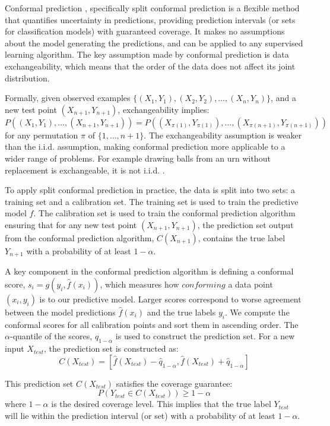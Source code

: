 Conformal prediction \cite{vovk2022algorithmic}, specifically split conformal prediction is a flexible method that quantifies uncertainty in predictions, providing prediction intervals (or sets for classification models) with guaranteed coverage. It makes no assumptions about the model generating the predictions, and can be applied to any supervised learning algorithm.
The key assumption made by conformal prediction is data exchangeability, which means that the order of the data does not affect its joint distribution.

Formally, given observed examples $\{(X_1, Y_1), (X_2, Y_2), \ldots, (X_n, Y_n)\}$, and a new test point $(X_{n+1}, Y_{n+1})$, exchangeability implies:
\begin{equation}
P((X_1, Y_1), \ldots, (X_{n+1}, Y_{n+1})) = P((X_{\pi(1)}, Y_{\pi(1)}), \ldots, (X_{\pi(n+1)}, Y_{\pi(n+1)}))
\end{equation}
for any permutation $\pi$ of $\{1, \ldots, n + 1\}$.
The exchangeability assumption is weaker than the i.i.d. assumption, making conformal prediction more applicable to a wider range of problems. For example drawing balls from an urn without replacement is exchangeable, it is not i.i.d. \cite{lehmann2005testing}.

To apply split conformal prediction in practice, the data is split into two sets: a training set and a calibration set. The training set is used to train the predictive model $f$. The calibration set is used to train the conformal prediction algorithm ensuring that for any new test point $(X_{n+1}, Y_{n+1})$, the prediction set output from the conformal prediction algorithm, $C(X_{n+1})$, contains the true label $Y_{n+1}$ with a probability of at least $1 - \alpha$.

A key component in the conformal prediction algorithm is defining a conformal score, $s_i = g(y_i, \hat{f}(x_i))$, which measures how $conforming$ a data point $(x_i, y_i)$ is to our predictive model. Larger scores correspond to worse agreement between the model predictions $\hat{f}(x_i)$ and the true labels $y_i$. We compute the conformal scores for all calibration points and sort them in ascending order. The $\alpha$-quantile of the scores, $\hat{q}_{1-\alpha}$ is used to construct the prediction set. For a new input $X_{test}$, the prediction set is constructed as:
$$C(X_{test}) = [\hat{f}(X_{test}) - \hat{q}_{1-\alpha}, \hat{f}(X_{test}) + \hat{q}_{1-\alpha}]$$

This prediction set $C(X_{test})$ satisfies the coverage guarantee:
$$P(Y_{test} \in C(X_{test})) \geq 1 - \alpha$$
where $1 - \alpha$ is the desired coverage level. This implies that the true label $Y_{test}$ will lie within the prediction interval (or set) with a probability of at least $1 - \alpha$.

